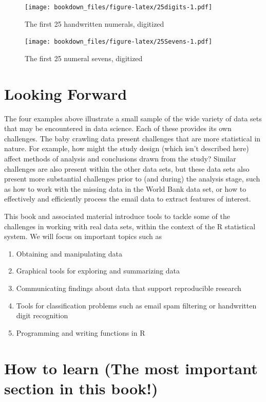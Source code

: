 \documentclass[
]{krantz}
\providecommand{\tightlist}{%
  \setlength{\itemsep}{0pt}\setlength{\parskip}{0pt}}
\begin{document}
\begin{figure}
\centering
\texttt{[image: bookdown\_files/figure-latex/25digits-1.pdf]}
\caption{\label{fig:25digits}The first 25 handwritten numerals, digitized}
\end{figure}

\begin{figure}
\centering
\texttt{[image: bookdown\_files/figure-latex/25Sevens-1.pdf]}
\caption{\label{fig:25Sevens}The first 25 numeral sevens, digitized}
\end{figure}

\hypertarget{looking-forward}{%
\section{Looking Forward}\label{looking-forward}}

The four examples above illustrate a small sample of the wide variety of data sets that may be encountered in data science. Each of these provides its own challenges. The baby crawling data present challenges that are more statistical in nature. For example, how might the study design (which isn't described here) affect methods of analysis and conclusions drawn from the study? Similar challenges are also present within the other data sets, but these data sets also present more substantial challenges prior to (and during) the analysis stage, such as how to work with the missing data in the World Bank data set, or how to effectively and efficiently process the email data to extract features of interest.

This book and associated material introduce tools to tackle some of the challenges in working with real data sets, within the context of the R statistical system. We will focus on important topics such as

\begin{enumerate}
\def\labelenumi{\arabic{enumi}.}
\tightlist
\item
  Obtaining and manipulating data
\item
  Graphical tools for exploring and summarizing data
\item
  Communicating findings about data that support reproducible research
\item
  Tools for classification problems such as email spam filtering or handwritten digit recognition
\item
  Programming and writing functions in R
\end{enumerate}

\hypertarget{how-to-learn-the-most-important-section-in-this-book}{%
\section{How to learn (The most important section in this book!)}\label{how-to-learn-the-most-important-section-in-this-book}}
\end{document}
